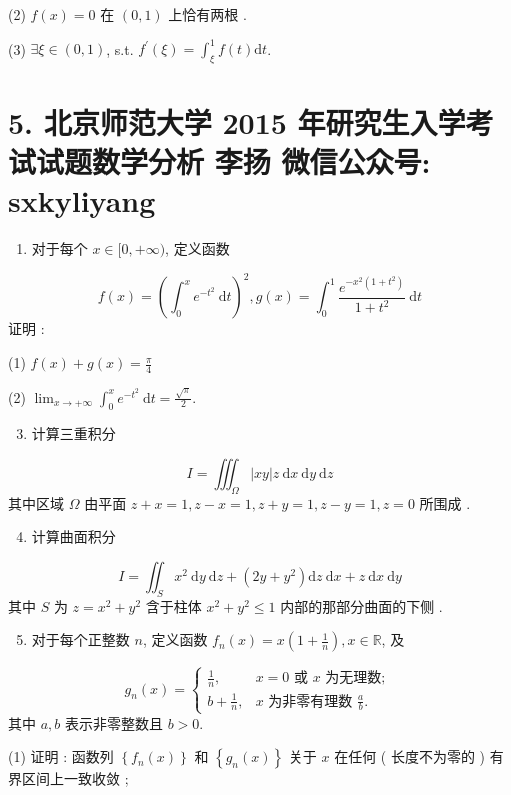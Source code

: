 \documentclass[10pt]{article}
\begin{document}
{(2) $f(x)=0$  在  $(0,1)$  上恰有两根 .

(3) $\exists \xi \in(0,1)$, s.t. $f^{\prime}(\xi)=\int_{\xi}^{1} f(t) \mathrm{d} t$.

\section{5. 北京师范大学 2015 年研究生入学考试试题数学分析 
 李扬 
 微信公众号: sxkyliyang}
\begin{enumerate}
  \item  对于每个  $x \in[0,+\infty)$,  定义函数 
\end{enumerate}
$$
f(x)=\left(\int_{0}^{x} e^{-t^{2}} \mathrm{~d} t\right)^{2}, g(x)=\int_{0}^{1} \frac{e^{-x^{2}\left(1+t^{2}\right)}}{1+t^{2}} \mathrm{~d} t
$$
 证明 :

(1) $f(x)+g(x)=\frac{\pi}{4}$

(2) $\lim _{x \rightarrow+\infty} \int_{0}^{x} e^{-t^{2}} \mathrm{~d} t=\frac{\sqrt{\pi}}{2}$.

\begin{enumerate}
  \setcounter{enumi}{2}
  \item  计算三重积分 
\end{enumerate}
$$
I=\iiint_{\Omega}|x y| z \mathrm{~d} x \mathrm{~d} y \mathrm{~d} z
$$
 其中区域  $\Omega$  由平面  $z+x=1, z-x=1, z+y=1, z-y=1, z=0$  所围成 .

\begin{enumerate}
  \setcounter{enumi}{3}
  \item  计算曲面积分 
\end{enumerate}
$$
I=\iint_{S} x^{2} \mathrm{~d} y \mathrm{~d} z+\left(2 y+y^{2}\right) \mathrm{d} z \mathrm{~d} x+z \mathrm{~d} x \mathrm{~d} y
$$
 其中  $S$  为  $z=x^{2}+y^{2}$  含于柱体  $x^{2}+y^{2} \leqslant 1$  内部的那部分曲面的下侧 .

\begin{enumerate}
  \setcounter{enumi}{4}
  \item  对于每个正整数  $n$,  定义函数  $f_{n}(x)=x\left(1+\frac{1}{n}\right), x \in \mathbb{R}$,  及 
\end{enumerate}
$$
g_{n}(x)= \begin{cases}\frac{1}{n}, & x=0 \text { 或 } x \text { 为无理数; } \\ b+\frac{1}{n}, & x \text { 为非零有理数 } \frac{a}{b} .\end{cases}
$$
 其中  $a, b$  表示非零整数且  $b>0$.

(1)  证明 :  函数列  $\left\{f_{n}(x)\right\}$  和  $\left\{g_{n}(x)\right\}$  关于  $x$  在任何  ( 长度不为零的 )  有界区间上一致收敛 ;

}
\end{document}
